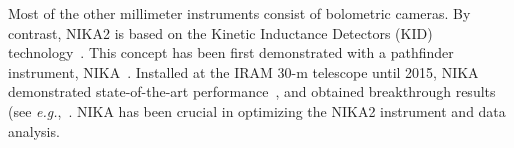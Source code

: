 Most of the other millimeter instruments consist of bolometric cameras. By contrast,
NIKA2 is based on the Kinetic Inductance Detectors (KID)
technology~\citep{Day2003, Doyle2008_LEKID, Shu2018_LEKID}. This concept has been
first demonstrated with a pathfinder instrument,
NIKA~\citep{Monfardini2010_NIKA, Monfardini2011_NIKA}.
Installed at the IRAM 30-m telescope until 2015, NIKA demonstrated
state-of-the-art performance~\citep{Catalano2014}, and obtained
breakthrough results
(see \emph{e.g.},~\citet{Adam2014, Adam2017_kSZ}.
NIKA has been crucial in optimizing the NIKA2 instrument and data
analysis. 

%

